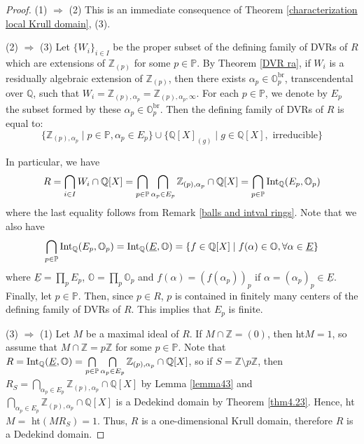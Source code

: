 \documentclass[10pt]{article}
\numberwithin{equation}{section}
\theoremstyle{definition}
\theoremstyle{definition}
\newcommand{\Q}{\mathbb{Q}}
\newcommand{\Z}{\mathbb{Z}}
\renewcommand{\O}{\mathbb{O}}
\newcommand{\PP}{\mathbb{P}}
\newcommand{\Int}{\textnormal{Int}}
\newcommand{\IntQ}{\Int_{\Q}}
\newcommand{\uE}{\underline{E}}
\newcommand{\br}{\text{br}}
\begin{document}
\begin{proof}
(1) $\Rightarrow$ (2) This is an immediate consequence of Theorem \ref{characterization local Krull domain}, (3).

(2) $\Rightarrow$ (3) Let $\{W_i\}_{i\in I}$ be the proper subset of the defining family of DVRs of $R$ which are extensions of $\Z_{(p)}$ for some $p\in\PP$. By Theorem \ref{DVR ra}, if $W_i$ is a residually algebraic extension of $\Z_{(p)}$, then there exists $\alpha_p\in\O_p^{\br}$, transcendental over $\Q$, such that $W_i=\Z_{(p),\alpha_p}=\Z_{(p),\alpha_p,\infty}$. For each $p\in\PP$, we denote by $E_p$ the subset formed by these $\alpha_p\in\O_p^{\br}$. Then   the defining family of DVRs of $R$ is equal to:
$$\{\Z_{(p),\alpha_p}\mid p\in\PP,\alpha_p\in E_p\}\cup\{\Q[X]_{(g)}\mid g\in\Q[X], \text{ irreducible}\}$$

In particular, we have
$$R=\bigcap_{i\in I}W_i\cap\Q[X]=\bigcap_{p\in\PP}\bigcap_{\alpha_p\in E_p}\Z_{(p),\alpha_p}\cap\Q[X]=\bigcap_{p\in\PP}\IntQ(E_p,\O_p)$$
where the last equality follows from Remark \ref{balls and intval rings}. Note that we also have
$$\bigcap_{p\in\PP}\IntQ(E_p,\O_p)=\IntQ(\uE,\O)=\{f\in\Q[X]\mid f(\alpha)\in\O,\forall\alpha\in \uE\}$$
where $\uE=\prod\limits_p E_p$, $\O=\prod\limits_p \O_p$ and $f(\alpha)=(f(\alpha_p))_p$ if $\alpha=(\alpha_p)_p\in\uE$.
 Finally, let $p\in\PP$. Then, since $p\in R$, $p$ is contained in finitely many centers of the defining family of DVRs of $R$. This implies that $E_p$ is finite.



(3) $\Rightarrow$ (1) Let $M$ be a maximal ideal of $R$. 
If $M \cap \Z = (0)$, then ht$M=1$, so assume that $M \cap \Z = p\Z$
for some $p \in \PP$. Note that
$R = \IntQ(\uE,\O) = \bigcap\limits_{p\in\PP}\bigcap\limits_{\alpha_p\in E_p}\Z_{(p),\alpha_p}\cap\Q[X]$, so if $S = \Z \setminus p\Z$, then
$R_S = \bigcap\limits_{\alpha_p\in E_p}\Z_{(p),\alpha_p}\cap\Q[X]$
by Lemma \ref{lemma43} and $\bigcap\limits_{\alpha_p\in E_p}\Z_{(p),\alpha_p}\cap\Q[X]$ is a Dedekind domain by Theorem \ref{thm4.23}. Hence, ht$M =$ ht$(MR_S) =1$.
Thus, $R$ is a one-dimensional Krull domain, therefore $R$ is a Dedekind domain.



\end{proof}
\end{document}
